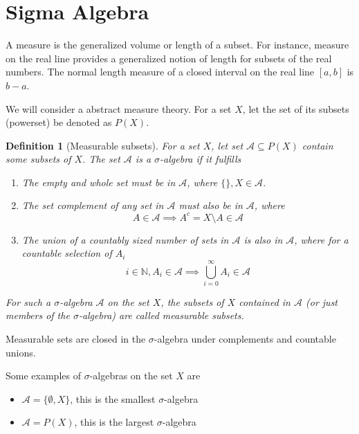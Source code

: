 \documentclass{article}
\newtheorem{defi}{Definition}[section]
\begin{document}
\section{Sigma Algebra}
A measure is the generalized volume or length of a subset. For instance, measure on the real line provides a generalized notion of length for subsets of the real numbers. The normal length measure of a closed interval on the real line $[a, b]$ is $b-a$.

We will consider a abstract measure theory. For a set $X$, let the set of its subsets (powerset) be denoted as $P(X)$.

\begin{defi}[Measurable subsets]
    For a set $X$, let set $\mathcal{A} \subseteq P(X)$ contain some subsets of $X$. The set $\mathcal A$ is a $\sigma$-algebra if it fulfills
    \begin{enumerate}
        \item The empty and whole set must be in $\mathcal A$, where $\{\}, X \in \mathcal A$.
        \item The set complement of any set in $\mathcal A$ must also be in $\mathcal A$, where
        \[
            A \in \mathcal A \implies A^c = X \setminus A \in \mathcal A
        \]
        \item The union of a countably sized number of sets in $\mathcal A$ is also in $\mathcal A$, where for a countable selection of $A_i$
        \[
            i \in \mathbb{N}, A_i \in \mathcal A \implies \bigcup_{i = 0}^{\infty} A_i \in \mathcal A
        \]
    \end{enumerate}

    For such a $\sigma$-algebra $\mathcal A$ on the set $X$, the subsets of $X$ contained in $\mathcal A$ (or just members of the $\sigma$-algebra) are called measurable subsets.
\end{defi}

Measurable sets are closed in the $\sigma$-algebra under complements and countable unions.

Some examples of $\sigma$-algebras on the set $X$ are
\begin{itemize}
    \item $\mathcal A = \{ \emptyset, X\}$, this is the smallest $\sigma$-algebra
    \item $\mathcal A = P(X)$, this is the largest $\sigma$-algebra
\end{itemize}

\newpage
\end{document}
